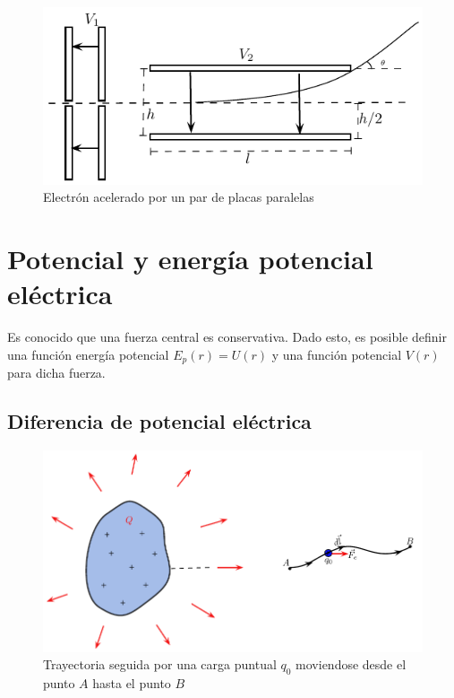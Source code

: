 \begin{figure}[h]
\begin{center}
\includegraphics[scale=0.8]{electrostatica/placas}
\end{center}
\caption{Electrón acelerado por un par de placas paralelas}
\label{figplacas}
\end{figure}

\section{Potencial y energía potencial eléctrica}

Es conocido que una fuerza central es conservativa. Dado esto, es posible definir una función energía potencial $E_p(r)=U(r)$ y una función potencial $V(r)$ para dicha fuerza.

\subsection{Diferencia de potencial eléctrica}

\begin{figure}
\begin{center}
\includegraphics[scale=0.6]{electrostatica/diferenciadepotencial}
\end{center}
\caption{Trayectoria seguida por una carga puntual $q_0$ moviendose desde el punto $A$ hasta el punto $B$}
\label{figdiferenciadepotencial}
\end{figure}

